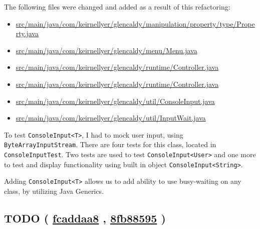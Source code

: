 \documentclass{article}
\newcommand{\code}[1]{\texttt{#1}}
\newcommand{\gh}[1]{%
  \href{https://github.com/awave1/assessment-loan-system/commit/#1}{#1}%
}
\begin{document}
The following files were changed and added as a result of this refactoring:
\begin{itemize}
  \item \href{https://github.com/awave1/assessment-loan-system/commit/bd538f05a6fbff8283b397c9a265040ab082542d#diff-1c55a45f266eb74be0a94a96e52a6c2a}{src/main/java/com/keirnellyer/glencaldy/manipulation/property/type/Property.java}
  \item \href{https://github.com/awave1/assessment-loan-system/commit/bd538f05a6fbff8283b397c9a265040ab082542d#diff-d9f6cc6de5b899354d46d7795b29022c}{src/main/java/com/keirnellyer/glencaldy/menu/Menu.java}
  \item \href{https://github.com/awave1/assessment-loan-system/commit/bd538f05a6fbff8283b397c9a265040ab082542d#diff-0f417f930dba04b27baaa509b7b80bbf}{src/main/java/com/keirnellyer/glencaldy/runtime/Controller.java}
  \item \href{https://github.com/awave1/assessment-loan-system/commit/bd538f05a6fbff8283b397c9a265040ab082542d#diff-a28d2a28f9e29d7231bd79421f225da1}{src/main/java/com/keirnellyer/glencaldy/runtime/Controller.java}
  \item \href{https://github.com/awave1/assessment-loan-system/commit/bd538f05a6fbff8283b397c9a265040ab082542d#diff-a28d2a28f9e29d7231bd79421f225da1}{src/main/java/com/keirnellyer/glencaldy/util/ConsoleInput.java}
  \item \href{https://github.com/awave1/assessment-loan-system/commit/bd538f05a6fbff8283b397c9a265040ab082542d#diff-c2879e1c4aeb580d558cae1973565454}{src/main/java/com/keirnellyer/glencaldy/util/InputWait.java}
\end{itemize}

To test \code{ConsoleInput<T>}, I had to mock user input, using \code{ByteArrayInputStream}. There are four tests for this class, located in \code{ConsoleInputTest}. Two tests are used to test \code{ConsoleInput<User>} and one more to test and display functionality using built in object \code{ConsoleInput<String>}.

Adding \code{ConsoleInput<T>} allows us to add ability to use busy-waiting on any class, by utilizing Java Generics.

\subsection*{TODO (\gh{fcaddaa8}, \gh{8fb88595})}
\end{document}

